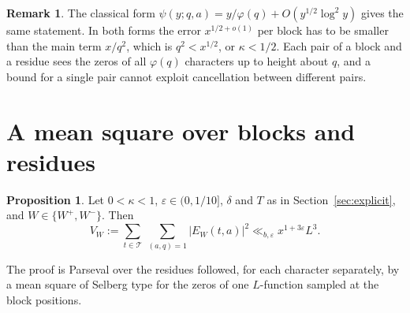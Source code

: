 \documentclass[11pt]{amsart}
\theoremstyle{definition}
\newtheorem{proposition}[theorem]{Proposition}
\newtheorem{remark}[theorem]{Remark}
\numberwithin{equation}{section}
\newcommand{\cT}{\mathcal{T}}
\begin{document}
\begin{remark}\label{rem:block}
The classical form $\psi(y;q,a)=y/\varphi(q)+O(y^{1/2}\log^2y)$ \cite[Ch.~20]{Dav} gives the same statement. In both forms the error $x^{1/2+o(1)}$ per block has to be smaller than the main term $x/q^2$, which is $q^2<x^{1/2}$, or $\kappa<1/2$. Each pair of a block and a residue sees the zeros of all $\varphi(q)$ characters up to height about $q$, and a bound for a single pair cannot exploit cancellation between different pairs.
\end{remark}

\section{A mean square over blocks and residues}\label{sec:meansquare}

\begin{proposition}\label{prop:meansquare}
Let $0<\kappa<1$, $\varepsilon\in(0,1/10]$, $\delta$ and $T$ as in Section~\ref{sec:explicit}, and $W\in\{W^+,W^-\}$. Then
\[
V_W:=\sum_{t\in\cT}\ \sum_{(a,q)=1}|E_W(t,a)|^2\ll_{b,\varepsilon}x^{1+3\varepsilon}L^3.
\]
\end{proposition}

The proof is Parseval over the residues followed, for each character separately, by a mean square of Selberg type for the zeros of one $L$-function sampled at the block positions.
\end{document}
